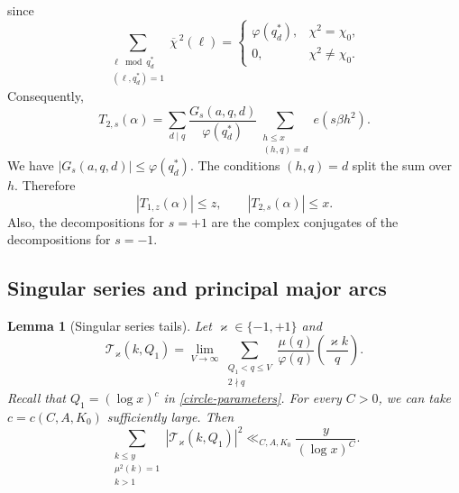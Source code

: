 \documentclass[12pt,reqno]{amsart}
\numberwithin{equation}{section}
\theoremstyle{plain}
\newtheorem{lemma}[theorem]{Lemma}
\theoremstyle{remark}
\begin{document}
since
\[
 \sum_{\substack{\ell\bmod q^*_{d}\\(\ell,q^*_{d})=1}}
 \overline{\chi}^{\,2}(\ell)
 =
 \begin{cases}
  \varphi(q^*_{d}),&\chi^2=\chi_0,\\
  0,&\chi^2\neq\chi_0.
 \end{cases}
\]
Consequently,
\begin{equation*}\label{T2-complete-sum}
 T_{2,s}(\alpha)
 =
 \sum_{d\mid q}
 \frac{G_s(a,q,d)}{\varphi(q^*_{d})}
 \sum_{\substack{h\leq x\\(h,q)=d}}
 e(s\beta h^2).
\end{equation*}
We have $|G_s(a,q,d)|\leq\varphi(q^*_{d})$.  The conditions $(h,q)=d$
split the sum over $h$.  Therefore
\begin{equation*}\label{T-bounds}
 |T_{1,z}(\alpha)|\leq z,
 \qquad |T_{2,s}(\alpha)|\leq x.
\end{equation*}
Also, the decompositions for $s=+1$ are the complex conjugates of the
decompositions for $s=-1$.

\subsection{Singular series and principal major arcs}

\begin{lemma}[Singular series tails]\label{lem:tail-bound}
Let $\varkappa\in\{-1,+1\}$ and
\[
 \mathcal T_\varkappa(k,Q_1)=
 \lim_{V\to\infty}
 \sum_{\substack{Q_1<q\leq V\\2\nmid q}}
 \frac{\mu(q)}{\varphi(q)}
 \left(\frac{\varkappa k}{q}\right).
\]
Recall that $Q_1=(\log x)^c$ in \eqref{circle-parameters}.
For every $C>0$, we can take $c=c(C,A,K_0)$ sufficiently large.  Then
\begin{equation}\label{tail-second-moment}
 \sum_{\substack{k\leq y\\\mu^2(k)=1\\k>1}}
 |\mathcal T_\varkappa(k,Q_1)|^2
 \ll_{C,A,K_0}\frac{y}{(\log x)^C}.
\end{equation}
\end{lemma}
\end{document}
